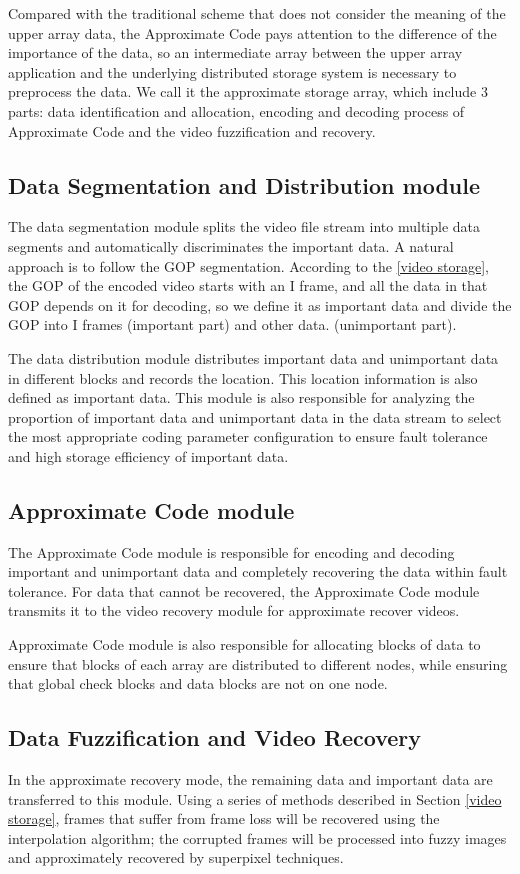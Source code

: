 \documentclass[sigconf]{acmart}
\begin{document}
Compared with the traditional scheme that does not consider the meaning of the upper array data, the Approximate Code pays attention to the difference of the importance of the data, so an intermediate array between the upper array application and the underlying distributed storage system is necessary to preprocess the data. We call it the approximate storage array, which include 3 parts: data identification and allocation, encoding and decoding process of Approximate Code and the video fuzzification and recovery.

\subsection{Data Segmentation and Distribution module}
The data segmentation module splits the video file stream into multiple data segments and automatically discriminates the important data. A natural approach is to follow the GOP segmentation. According to the \ref{video storage}, the GOP of the encoded video starts with an I frame, and all the data in that GOP depends on it for decoding, so we define it as important data and divide the GOP into I frames (important part) and other data. (unimportant part).

The data distribution module distributes important data and unimportant data in different blocks and records the location. This location information is also defined as important data. This module is also responsible for analyzing the proportion of important data and unimportant data in the data stream to select the most appropriate coding parameter configuration to ensure fault tolerance and high storage efficiency of important data.

\subsection{Approximate Code module}
The Approximate Code module is responsible for encoding and decoding important and unimportant data and completely recovering the data within fault tolerance. For data that cannot be recovered, the Approximate Code module transmits it to the video recovery module for approximate recover videos.

Approximate Code module is also responsible for allocating blocks of data to ensure that blocks of each array are distributed to different nodes, while ensuring that global check blocks and data blocks are not on one node.

\subsection{Data Fuzzification and Video Recovery}
In the approximate recovery mode, the remaining data and important data are transferred to this module. Using a series of methods described in Section \ref{video storage}, frames that suffer from frame loss will be recovered using the interpolation algorithm; the corrupted frames will be processed into fuzzy images and approximately recovered by superpixel techniques.
\end{document}
